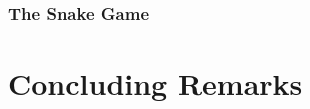 \documentclass[11pt]{article}
\begin{document}
\subsubsection*{The Snake Game}
\label{sec:orgbb8657d}

\section*{Concluding Remarks}
\label{sec:org201f3f8}
\end{document}
